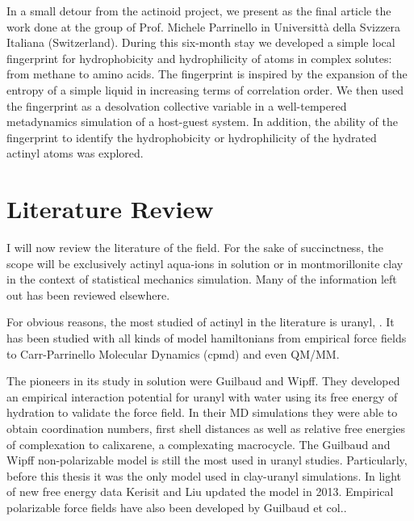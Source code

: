 In a small detour from the actinoid project, we present as the final article the work done at the 
group of Prof. Michele Parrinello in Universitt\`a della Svizzera Italiana (Switzerland). 
During this 
six-month stay we developed a simple local fingerprint for hydrophobicity and hydrophilicity 
of 
atoms in complex solutes: from methane to amino acids. The fingerprint is inspired by the 
expansion of the entropy of a simple liquid in increasing terms of correlation order. 
We then 
used the fingerprint as a desolvation collective variable in a well-tempered metadynamics 
simulation of a host-guest system. In addition, the ability of the fingerprint to identify the 
hydrophobicity or hydrophilicity of the hydrated actinyl atoms was explored. 

\section{Literature Review}

I will now  review the literature of the field. For the sake 
of succinctness, the scope will be exclusively actinyl aqua-ions in solution or in montmorillonite 
clay in the context of statistical mechanics simulation. Many of the information left out has been 
reviewed elsewhere\cite{ChemSocRev_Wang_2012,dolg2015computational}.

For obvious reasons, the most studied of actinyl in the literature is uranyl, 
. It 
has been studied with all kinds of model hamiltonians from empirical force fields to 
Carr-Parrinello Molecular Dynamics (\gls{cpmd}) and even QM/MM.

The pioneers in its study in solution were  
Guilbaud and Wipff\cite{JMolStr_Wipff_1996,JPhysChem_Wipff_1993}. They developed an empirical 
interaction 
potential for uranyl with water using its free energy of hydration to validate the force 
field. In their MD simulations they were able to obtain coordination numbers, 
first shell distances as well as relative free energies of complexation to calixarene, a 
complexating macrocycle. The 
Guilbaud and Wipff non-polarizable model is still the most used in uranyl studies. 
Particularly, 
before this thesis it was the only model used in clay-uranyl simulations. In light of new free 
energy data Kerisit and Liu updated the model in 2013\cite{JPhysChemA_Kerisit_2013}. Empirical 
polarizable force fields have also been developed by Guilbaud et 
col.\cite{Nguyen2015,Duvail2019}. 

